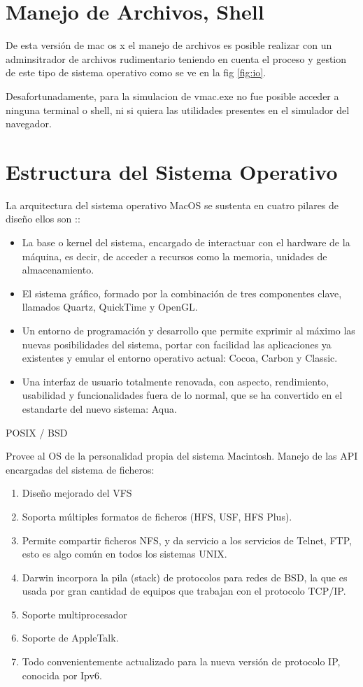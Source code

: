 \documentclass[paper=a4, fontsize=12pt]{article} 		%
\numberwithin{equation}{section}						%
\numberwithin{table}{section} 							%
\begin{document}
\section{Manejo de Archivos, Shell}
De esta versión de mac os x el manejo de archivos es posible realizar con un adminsitrador de archivos rudimentario teniendo en cuenta el proceso y gestion de este tipo de sistema operativo como se ve en la fig \ref{fig:io}. 

Desafortunadamente, para la simulacion de vmac.exe no fue posible acceder a ninguna terminal o shell, ni si quiera las utilidades presentes en el simulador del navegador. 

\section{Estructura del Sistema Operativo}
La arquitectura del sistema operativo MacOS se sustenta en cuatro pilares de diseño ellos son ::
\begin{itemize}
\item La base o kernel del sistema, encargado de interactuar con el hardware de la máquina, es decir, de acceder a recursos como la memoria, unidades de almacenamiento.
\item El sistema gráfico, formado por la combinación de tres componentes clave, llamados Quartz, QuickTime y OpenGL.
\item Un entorno de programación y desarrollo que permite exprimir al máximo las nuevas posibilidades del sistema, portar con facilidad las aplicaciones ya existentes y emular el entorno operativo actual: Cocoa, Carbon y Classic.
\item  Una interfaz de usuario totalmente renovada, con aspecto, rendimiento, usabilidad y funcionalidades fuera de lo normal, que se ha convertido en el estandarte del nuevo sistema: Aqua.
\end{itemize}
POSIX / BSD

Provee al OS de la personalidad propia del sistema Macintosh.
Manejo de las API encargadas del sistema de ficheros:

\begin{enumerate}
\item Diseño mejorado del VFS
\item Soporta múltiples formatos de ficheros (HFS, USF, HFS Plus).
\item Permite compartir ficheros NFS, y da servicio a los servicios de Telnet, FTP, esto es algo común en todos los sistemas UNIX.
\item Darwin incorpora la pila (stack) de protocolos para redes de BSD, la que es usada por gran cantidad de equipos que trabajan con el protocolo TCP/IP.
\item Soporte multiprocesador
\item Soporte de AppleTalk.
\item Todo convenientemente actualizado para la nueva versión de protocolo IP, conocida por Ipv6.
\end{enumerate}
\end{document}
